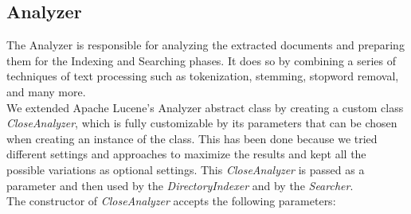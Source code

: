 \subsection{Analyzer} \label{analyzer_subsec}
The Analyzer is responsible for analyzing the extracted documents and preparing them for the Indexing and Searching phases. 
It does so by combining a series of techniques of text processing such as tokenization, stemming, stopword removal, and many more.\\
We extended Apache Lucene's Analyzer abstract class \cite{luceneanalyzer} by creating a custom class \textit{CloseAnalyzer}, which is fully customizable by its parameters that can be chosen when creating an instance of the class. 
This has been done because we tried different settings and approaches to maximize the results and kept all the possible variations as optional settings.
This \textit{CloseAnalyzer} is passed as a parameter and then used by the \textit{DirectoryIndexer} and by the \textit{Searcher}. \\
The constructor of \textit{CloseAnalyzer} accepts the following parameters:
